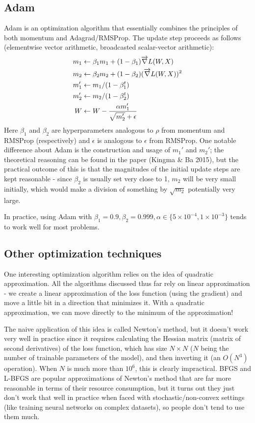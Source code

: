 \subsection{Adam}
Adam is an optimization algorithm that essentially combines the principles of both momentum and Adagrad/RMSProp. The update step proceeds as follows (elementwise vector arithmetic, broadcasted scalar-vector arithmetic):
\begin{align*}
m_1 &\leftarrow \beta_1 m_1 + (1 - \beta_1) \overrightarrow{\nabla} L(W, X) \\
m_2 &\leftarrow \beta_2 m_2 + (1  - \beta_2) (\overrightarrow{\nabla} L(W, X))^2 \\
m_1' &\leftarrow m_1/(1 - \beta_1^t) \\
m_2' &\leftarrow m_2/(1 - \beta_2^t) \\
W &\leftarrow W - \frac{\alpha m_1'}{\sqrt{m_2'} + \epsilon}
\end{align*}
Here $\beta_1$ and $\beta_2$ are hyperparameters analogous to $\rho$ from momentum and RMSProp (respectively) and $\epsilon$ is analogous to $\epsilon$ from RMSProp. One notable difference about Adam is the construction and usage of $m_1'$ and $m_2'$; the theoretical reasoning can be found in the paper (Kingma \& Ba 2015), but the practical outcome of this is that the magnitudes of the initial update steps are kept reasonable - since $\beta_2$ is usually set very close to 1, $m_2$ will be very small initially, which would make a division of something by $\sqrt{m_2}$ potentially very large.

In practice, using Adam with $\beta_1 = 0.9, \beta_2 = 0.999, \alpha \in \{5\times 10^{-4}, 1\times 10^{-3}\}$ tends to work well for most problems.

\subsection{Other optimization techniques}
One interesting optimization algorithm relies on the idea of quadratic approximation. All the algorithms discussed thus far rely on linear approximation - we create a linear approximation of the loss function (using the gradient) and move a little bit in a direction that minimizes it. With a quadratic approximation, we can move directly to the minimum of the approximation!

The naive application of this idea is called Newton's method, but it doesn't work very well in practice since it requires calculating the Hessian matrix (matrix of second derivatives) of the loss function, which has size $N \times N$ ($N$ being the number of trainable parameters of the model), and then inverting it (an $O(N^3)$ operation). When $N$ is much more than $10^6$, this is clearly impractical. BFGS and L-BFGS are popular approximations of Newton's method that are far more reasonable in terms of their resource consumption, but it turns out they just don't work that well in practice when faced with stochastic/non-convex settings (like training neural networks on complex datasets), so people don't tend to use them much.

